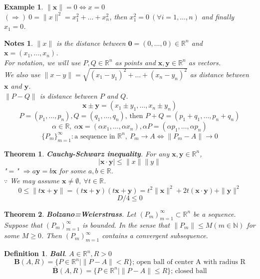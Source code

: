 \documentclass[a4paper,10pt]{article}
\newtheorem{theo}{Theorem}
\newtheorem{defi}{Definition}
\newtheorem{ex}{Example}
\newtheorem{note}{Notes}
\newcommand{\R}{\mathbb{R}}
\newcommand{\N}{\mathbb{N}}
\newcommand{\bx}{\mathbf{x}}
\newcommand{\by}{\mathbf{y}}
\begin{document}
\begin{ex}
	$ \|\bx\|=0 \Leftrightarrow x=0$\\
	$ (\Rightarrow) \ 0 = \| x \|^2 = x_{1}^2 + \dots + x_{n}^2 $, then $ x_{1}^2 =0 \ (\forall i =1, \dots, n )$ and finally $ x_{1}=0 $.
\end{ex}

\begin{note}
	$ \| x \| $ is the distance between $ \mathbf{0} = (0, \dots, 0) \in \R^n $ and $ \bx= (x_{1}, \dots, x_{n}) $.\\
	For notation, we will use $ P,Q \in \R^n $ as points and  $ \bx, \by \in \R^n $ as vectors. \\
	We also use $ \| x-y \| = \sqrt{(x_{1}-y_{1})^2 + \dots + (x_{n}-y_{n})^2} $ as distance between $ \bx $ and $ \by $. \\
	$ \| P-Q \| $ is distance between $ P $ and $ Q $.
	\[ \bx \pm \by = ( x_{1} \pm y_{1} , \dots, x_{n} \pm y_{n} ) \]
	\[ P=(p_{1}, \dots, p_{n}) ,  Q = (q_{1}, \dots, q_{n})  \text{, then } P+Q = (p_{1}+q_{1}, \dots, p_{n}+q_{n}) \]
	\[ \alpha \in \R, \ \alpha\bx = (\alpha x_{1}, \dots, \alpha x_{n}),  \alpha P = (\alpha p_{1}, \dots, \alpha p_{n})\]
	\[  \{P_{m}\}_{m=1}^{\infty} : \text{a sequence in } \R^n , \ P_{m} \rightarrow A \Leftrightarrow \| P_{m}-A \| \rightarrow 0 \]
\end{note}

\begin{theo}
	\textbf{Cauchy-Schwarz inequality}. For any $ \bx, \by \in \R^n $,
	\[ \mid \bx \cdot \by \mid \leq \| x \| \| y \| \]
	"$ = $" $ \Rightarrow  a\by = b\bx$ for some $ a,b \in \R $.\\
	$ \because $ We may assume $ \bx \neq \emptyset , \ \forall t \in \R $.
	\[ 0 \leq \| t\bx+\by \| = (t\bx+\by) (t\bx+\by) =  t^2 \|\bx\|^2 + 2t(\bx\cdot\by)+\|\by\|^2 \]
	\[D/4 \leq 0\]
\end{theo}

\begin{theo}
	\textbf{Bolzano=Weierstrass}. Let $ (P_{m})_{m=1}^{\infty} \subset \R^n $ be a sequence. Suppose that $ (P_{m})_{m=1}^{\infty} $ is bounded. In the sense that $ \|P_{m}\| \leq M (m \in \N) $ for some $ M \geq 0 $. Then $ (P_{m})_{m=1}^{\infty} $ contains a convergent subsequence.
\end{theo}

\begin{defi}
	\textbf{Ball}. $ A \in \R^n, R>0 $
	\[ \mathbf{B}(A,R) = \{ P \in \R^n | \|P-A\|<R \} \text{; open ball of center A with radius R} \]
	\[ \overline{\mathbf{B}}(A,R) = \{ P \in \R^n | \|P-A\|\leq R \} \text{; closed ball} \]
\end{defi}
\end{document}
